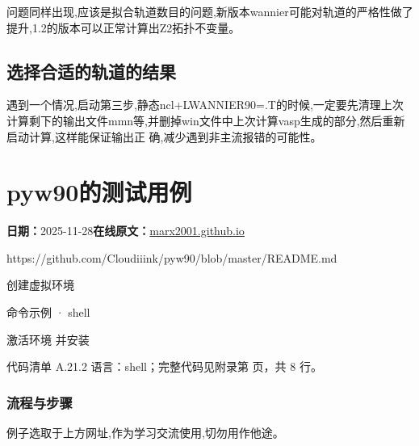 \documentclass[lang=cn,scheme=chinese,color=blue,device=normal,toc=onecol,math=cm]{elegantbook}
\begin{document}
问题同样出现,应该是拟合轨道数目的问题,新版本wannier可能对轨道的严格性做了提升,1.2的版本可以正常计算出Z2拓扑不变量。\par


\subsection{选择合适的轨道的结果}


遇到一个情况,启动第三步,静态ncl+LWANNIER90=.T的时候,一定要先清理上次计算剩下的输出文件mmn等,并删掉win文件中上次计算vasp生成的部分,然后重新启动计算,这样能保证输出正 确,减少遇到非主流报错的可能性。\par



\section{pyw90的测试用例}
\begin{articlemeta}
\textbf{日期：}2025-11-28\hfill\textbf{在线原文：}\href{https://marx2001.github.io/sci-note\_posts/20251128-pyw-test}{marx2001.github.io}
\end{articlemeta}

https:/\allowbreak{}/\allowbreak{}github.com/\allowbreak{}Cloudiiink/\allowbreak{}pyw90/\allowbreak{}blob/\allowbreak{}master/\allowbreak{}README.md\par


创建虚拟环境\par


\begin{inlinecodebox}{命令示例 · shell}
\end{inlinecodebox}


激活环境 并安装\par


\begin{codeindexbox}{代码清单 A.21.2}
语言：shell；完整代码见附录第 \pageref{code:21:2} 页，共 8 行。
\end{codeindexbox}


\subsubsection{流程与步骤}


例子选取于上方网址,作为学习交流使用,切勿用作他途。\par
\end{document}
